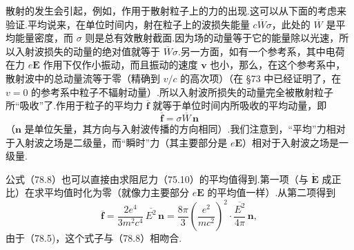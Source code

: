 散射的发生会引起，例如，作用于散射粒子上的力的出现.这可以从下面的考虑来验证.平均说来，在单位时间内，射在粒子上的波损失能量 $c\overline{W}\sigma$，此处的 $\overline{W}$ 是平均能量密度，而 $\sigma$ 则是总有效散射截面.因为场的动量等于它的能量除以光速，所以入射波损失的动量的绝对值就等于 $\overline{W}\sigma$.另一方面，如有一个参考系，其中电荷在力 $e\boldsymbol{E}$ 作用下仅作小振动，而且振动的速度 $\boldsymbol{v}$ 也小，那么，在这个参考系中，散射波中的总动量流等于零（精确到 $v/c$ 的高次项）（在 §73 中已经证明了，在 $v=0$ 的参考系中粒子不辐射动量）.所以入射波所损失的动量完全被散射粒子所“吸收”了.作用于粒子的平均力 $\overline{\boldsymbol{f}}$ 就等于单位时间内所吸收的平均动量，即
\begin{equation}
  \overline{\boldsymbol{f}}=\sigma\overline{W}\,\boldsymbol{n}
\end{equation}
（$\boldsymbol{n}$ 是单位矢量，其方向与入射波传播的方向相同）.我们注意到，“平均”力相对于入射波之场是二级量，而“瞬时”力（其主要部分是 $e\boldsymbol{E}$）相对于入射波之场是一级量.

公式（78.8）也可以直接由求阻尼力（75.10）的平均值得到.第一项（与 $\dot{\boldsymbol{E}}$ 成正比）在求平均值时化为零（就像力主要部分 $e\boldsymbol{E}$ 的平均值一样）.从第二项得到
\begin{equation*}
  \overline{\boldsymbol{f}}=\frac{2e^4}{3m^2c^4}\,\overline{E^2}\,\boldsymbol{n}
  =\frac{8\pi}{3}\left(\frac{e^2}{mc^2}\right)^{\!2}\cdot\frac{\overline{E^2}}{4\pi}\,\boldsymbol{n},
\end{equation*}
由于（78.5)，这个式子与（78.8）相吻合.

